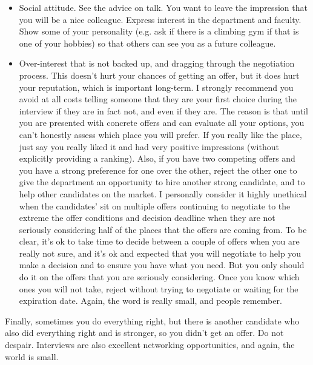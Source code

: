 \documentclass{article}
\begin{document}
{\begin{itemize}
\item Social attitude. See the advice on talk. You want to leave the impression that you will be a nice colleague. Express interest in the department and faculty. Show some of your personality (e.g. ask if there is a climbing gym if that is one of your hobbies) so that others can see you as a future colleague.

\item Over-interest that is not backed up, and dragging through the negotiation process. This doesn't hurt your chances of getting an offer, but it does hurt your reputation, which is important long-term. I strongly recommend you avoid at all costs telling someone that they are your first choice during the interview if they are in fact not, and even if they are. The reason is that until you are presented with concrete offers and can evaluate all your options, you can't honestly assess which place you will prefer. If you really like the place, just say you really liked it and had very positive impressions (without explicitly providing a ranking).  Also, if you have two competing offers and you have a strong preference for one over the other, reject the other one to give the department an opportunity to hire another strong candidate, and to help other candidates on the market. I personally consider it highly unethical when the candidates' sit on multiple offers continuing to negotiate to the extreme the offer conditions and decision deadline when they are not seriously considering half of the places that the offers are coming from. To be clear, it's ok to take time to decide between a couple of offers when you are really not sure, and it's ok and expected that you will negotiate to help you make a decision and to ensure you have what you need. But you only should do it on the offers that you are seriously considering. Once you know which ones you will not take, reject without trying to negotiate or waiting for the expiration date. Again, the word is really small, and people remember.
\end{itemize}


Finally, sometimes you do everything right, but there is another candidate who also did everything right and is stronger, so you didn't get an offer. Do not despair. Interviews are also excellent networking opportunities, and again, the world is small. 

}

%
%
%
%
\end{document}
